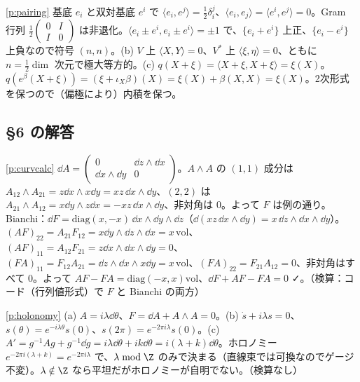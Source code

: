 \begin{sol}{\ref{p:pairing}}
基底 $e_i$ と双対基底 $e^i$ で $\langle e_i,e^j\rangle=\frac12\delta_i^j$、$\langle e_i,e_j\rangle=\langle e^i,e^j\rangle=0$。Gram 行列 $\frac12\begin{pmatrix}0&I\\I&0\end{pmatrix}$ は非退化。$\langle e_i\pm e^i,e_i\pm e^i\rangle=\pm1$ で、$\{e_i+e^i\}$ 上正、$\{e_i-e^i\}$ 上負なので符号 $(n,n)$。(b) $V$ 上 $\langle X,Y\rangle=0$、$V^*$ 上 $\langle\xi,\eta\rangle=0$、ともに $n=\frac12\dim$ 次元で極大等方的。(c) $q(X+\xi)=\langle X+\xi,X+\xi\rangle=\xi(X)$。$q(e^\beta(X+\xi))=(\xi+\iota_X\beta)(X)=\xi(X)+\beta(X,X)=\xi(X)$。2次形式を保つので（偏極により）内積を保つ。
\end{sol}

\subsection*{§6 の解答}
\begin{sol}{\ref{p:curvcalc}}
$\dd A=\begin{pmatrix}0&\dd z\wedge\dd x\\\dd x\wedge\dd y&0\end{pmatrix}$。$A\wedge A$ の $(1,1)$ 成分は $A_{12}\wedge A_{21}=z\dd x\wedge x\dd y=xz\,\dd x\wedge\dd y$、$(2,2)$ は $A_{21}\wedge A_{12}=x\dd y\wedge z\dd x=-xz\,\dd x\wedge\dd y$、非対角は $0$。よって $F$ は例の通り。Bianchi：$\dd F=\mathrm{diag}(x,-x)\,\dd x\wedge\dd y\wedge\dd z$（$\dd(xz\,\dd x\wedge\dd y)=x\,\dd z\wedge\dd x\wedge\dd y$）。$(AF)_{22}=A_{21}F_{12}=x\dd y\wedge\dd z\wedge\dd x=x\,\mathrm{vol}$、$(AF)_{11}=A_{12}F_{21}=z\dd x\wedge\dd x\wedge\dd y=0$、$(FA)_{11}=F_{12}A_{21}=\dd z\wedge\dd x\wedge x\dd y=x\,\mathrm{vol}$、$(FA)_{22}=F_{21}A_{12}=0$、非対角はすべて $0$。よって $AF-FA=\mathrm{diag}(-x,x)\mathrm{vol}$、$\dd F+AF-FA=0$ ✓。（検算：コード（行列値形式）で $F$ と Bianchi の両方）
\end{sol}
\begin{sol}{\ref{p:holonomy}}
(a) $A=i\lambda\dd\theta$、$F=\dd A+A\wedge A=0$。(b) $\dot s+i\lambda s=0$、$s(\theta)=e^{-i\lambda\theta}s(0)$、$s(2\pi)=e^{-2\pi i\lambda}s(0)$。(c) $A'=g^{-1}Ag+g^{-1}\dd g=i\lambda\dd\theta+ik\dd\theta=i(\lambda+k)\dd\theta$。ホロノミー $e^{-2\pi i(\lambda+k)}=e^{-2\pi i\lambda}$ で、$\lambda\bmod\Z$ のみで決まる（直線束では可換なのでゲージ不変）。$\lambda\notin\Z$ なら平坦だがホロノミーが自明でない。（検算なし）
\end{sol}

